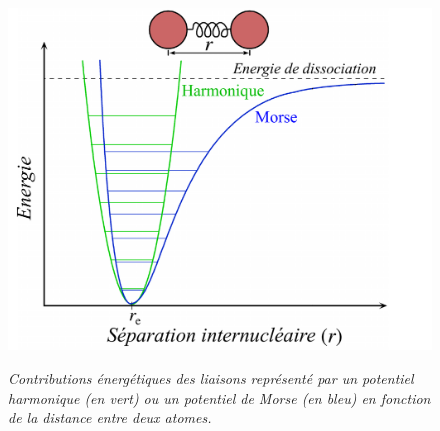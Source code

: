 \begin{figure}
  \centering
  {\includegraphics[width=0.75\linewidth]{./figures/ch1/harmonic_vs_morse_potential.pdf}}
    \caption{\it Contributions énergétiques des liaisons représenté par un potentiel harmonique (en vert) ou un potentiel de Morse (en bleu) en fonction de la distance entre deux atomes.}
    \label{Fig:harmonic_morse_potential}
  \hspace{0.3cm}
\end{figure}

